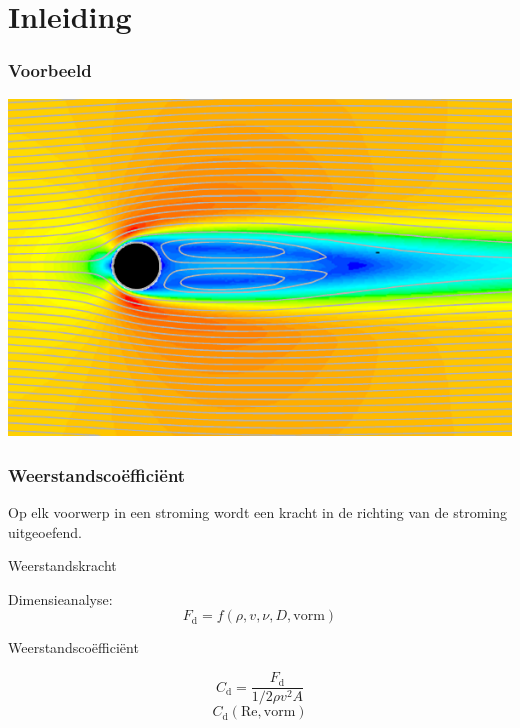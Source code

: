 \documentclass[t]{beamer}
\subtitle{Vormweerstand en vleugelprofielen}
\begin{document}
	\frame{\titlepage}
	\section{Inleiding}
	\begin{frame}
		\frametitle{Voorbeeld}
		\center
		\vspace{-0.5cm}
    	\includegraphics[width=\textwidth]{../fig/uitwendige_stroming/Cilinderstroming_snelheid_stroomlijnen_Re100}
  	\end{frame}
	\begin{frame}
		\frametitle{Weerstandscoëfficiënt}
		Op elk voorwerp in een stroming wordt een kracht in de richting van de stroming uitgeoefend.
		
		\pause
		\begin{center}
			Weerstandskracht
		\end{center}			
		
		\pause
		Dimensieanalyse:
		\begin{equation*}
    		F_\mathrm{d} = f\left( \rho,v,\nu,D,\mathrm{vorm} \right)
    	\end{equation*}
		
		\pause
		\vspace{0.3cm}
		\begin{center}
			Weerstandscoëfficiënt
		\end{center}
    	\begin{equation}
    		C_\mathrm{d} = \frac{F_\mathrm{d}}{1/2 \rho v^2 A}
    	\end{equation}
    	\begin{equation*}
    		C_\mathrm{d}(\mathrm{Re},\mathrm{vorm})
    	\end{equation*}
  	\end{frame}
\end{document}
